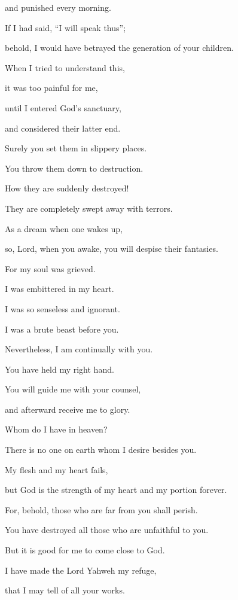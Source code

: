 {\par }{\QB and punished every morning.
\par }{\Q {}If I had said, “I will speak thus”;
\par }{\QB behold, I would have betrayed the generation of your children.
\par }{\Q {}When I tried to understand this,
\par }{\QB it was too painful for me,
\par }{\Q {}until I entered God’s sanctuary,
\par }{\QB and considered their latter end.
\par }{\Q {}Surely you set them in slippery places.
\par }{\QB You throw them down to destruction.
\par }{\Q {}How they are suddenly destroyed!
\par }{\QB They are completely swept away with terrors.
\par }{\Q {}As a dream when one wakes up,
\par }{\QB so, Lord, when you awake, you will despise their fantasies.
\par }{\Q {}For my soul was grieved.
\par }{\QB I was embittered in my heart.
\par }{\Q {}I was so senseless and ignorant.
\par }{\QB I was a brute beast before you.
\par }{\Q {}Nevertheless, I am continually with you.
\par }{\QB You have held my right hand.
\par }{\Q {}You will guide me with your counsel,
\par }{\QB and afterward receive me to glory.
\par }{\Q {}Whom do I have in heaven?
\par }{\QB There is no one on earth whom I desire besides you.
\par }{\Q {}My flesh and my heart fails,
\par }{\QB but God is the strength of my heart and my portion forever.
\par }{\Q {}For, behold, those who are far from you shall perish.
\par }{\QB You have destroyed all those who are unfaithful to you.
\par }{\Q {}But it is good for me to come close to God.
\par }{\QB I have made the Lord Yahweh my refuge,
\par }{\QB that I may tell of all your works.
\par }{\BB \par }
